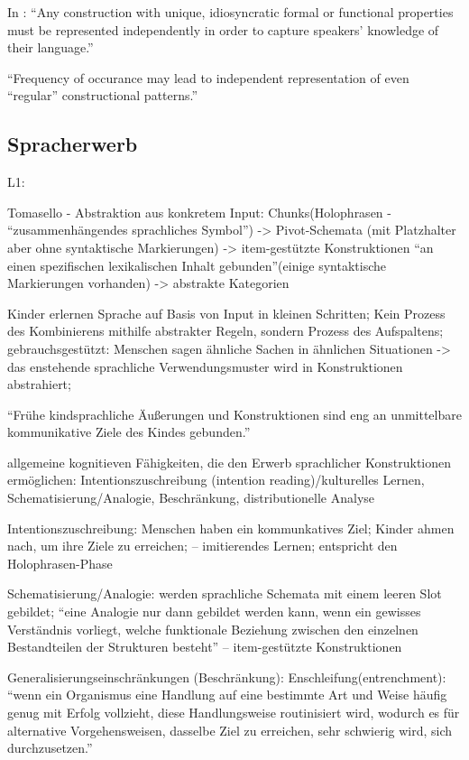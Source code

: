 \begin{itemize}
    In \cite{Ellis08}: ``Any construction with unique, idiosyncratic formal or functional properties must be represented independently in order to capture speakers' knowledge of their language.''

    ``Frequency of occurance may lead to independent representation of even ``regular'' constructional patterns.''
\end{itemize}

\subsection{Spracherwerb}
    L1:

    Tomasello - Abstraktion aus konkretem Input: Chunks(Holophrasen - ``zusammenhängendes sprachliches Symbol'') -> Pivot-Schemata (mit Platzhalter aber ohne syntaktische Markierungen) -> item-gestützte Konstruktionen ``an einen spezifischen lexikalischen Inhalt gebunden''(einige syntaktische Markierungen vorhanden) -> abstrakte Kategorien

        \cite{Tomasello06} Kinder erlernen Sprache auf Basis von Input in kleinen Schritten;
        Kein Prozess des Kombinierens mithilfe abstrakter Regeln, sondern Prozess des Aufspaltens;
        gebrauchsgestützt: Menschen sagen ähnliche Sachen in ähnlichen Situationen -> das enstehende sprachliche Verwendungsmuster wird in Konstruktionen abstrahiert;

        ``Frühe kindsprachliche Äußerungen und Konstruktionen sind eng an unmittelbare kommunikative Ziele des Kindes gebunden.''

        allgemeine kognitieven Fähigkeiten, die den Erwerb sprachlicher Konstruktionen ermöglichen: Intentionszuschreibung (intention reading)/kulturelles Lernen, Schematisierung/Analogie, Beschränkung, distributionelle Analyse

        Intentionszuschreibung: Menschen haben ein kommunkatives Ziel; Kinder ahmen nach, um ihre Ziele zu erreichen; -- imitierendes Lernen; entspricht den Holophrasen-Phase

        Schematisierung/Analogie: werden sprachliche Schemata mit einem leeren Slot gebildet;
        ``eine Analogie nur dann gebildet werden kann, wenn ein gewisses Verständnis vorliegt, welche funktionale Beziehung zwischen den einzelnen Bestandteilen der Strukturen besteht''
        -- item-gestützte Konstruktionen

        Generalisierungseinschränkungen (Beschränkung):
        Enschleifung(entrenchment): ``wenn ein Organismus eine Handlung auf eine bestimmte Art und Weise häufig genug mit Erfolg vollzieht, diese Handlungsweise routinisiert wird, wodurch es für alternative Vorgehensweisen, dasselbe Ziel zu erreichen, sehr schwierig wird, sich durchzusetzen.''

